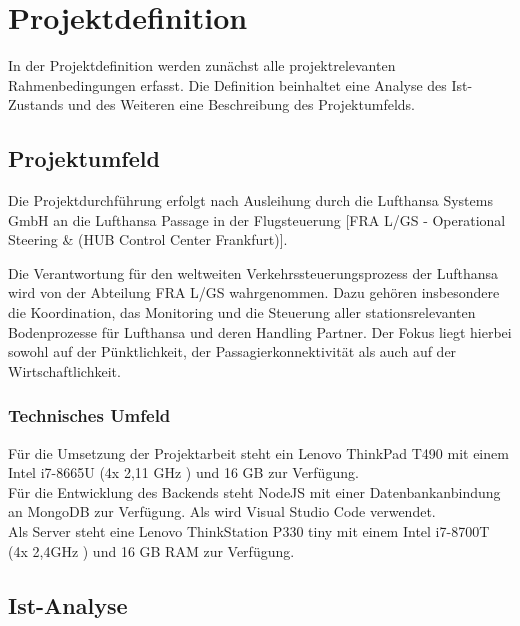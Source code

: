 \section{Projektdefinition}
	In der Projektdefinition werden zunächst alle projektrelevanten Rahmenbedingungen erfasst.
	Die Definition beinhaltet eine Analyse des Ist-Zustands und des Weiteren eine Beschreibung
	des Projektumfelds.

	\subsection{Projektumfeld}

		
		
		Die Projektdurchführung erfolgt nach Ausleihung durch die Lufthansa Systems GmbH an die Lufthansa Passage in der Flugsteuerung [FRA L/GS - Operational Steering \&  (HUB Control Center Frankfurt)].

		{
			\noindent
			Die Verantwortung für den weltweiten Verkehrssteuerungsprozess der Lufthansa wird von der
			Abteilung FRA L/GS wahrgenommen. Dazu gehören insbesondere die Koordination, das
			Monitoring und die Steuerung aller stationsrelevanten Bodenprozesse für Lufthansa und deren
			Handling Partner. Der Fokus liegt hierbei sowohl auf der Pünktlichkeit, der Passagierkonnektivität als auch auf der
			Wirtschaftlichkeit.
		}

		\subsubsection{Technisches Umfeld}
		{
			\noindent
			Für die Umsetzung der Projektarbeit steht ein Lenovo ThinkPad T490 mit einem Intel i7-8665U (4x 2,11 GHz ) und 16 GB   zur Verfügung.\\
			Für die Entwicklung des Backends steht NodeJS mit einer Datenbankanbindung an MongoDB zur Verfügung. Als  wird Visual Studio Code verwendet.
		}
		\\
		{
			\noindent
			Als Server steht eine Lenovo ThinkStation P330 tiny mit einem Intel i7-8700T (4x 2,4GHz ) und 16 GB RAM zur Verfügung.\\
		}
		
		\newpage

		\subsection{Ist-Analyse}

